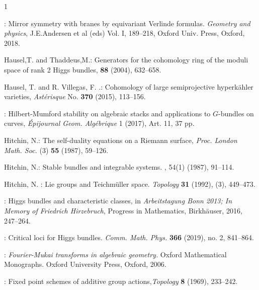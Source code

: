 \documentclass[12pt]{article}
\numberwithin{equation}{section}
\theoremstyle{remark}
\theoremstyle{definition}
\numberwithin{theorem}{section}
\renewcommand{\1}{\mathbbm{1}}
\begin{document}
\begin{thebibliography}{1}

:
Mirror symmetry with branes by equivariant Verlinde formulas. {\em Geometry and physics}, J.E.Andersen et al (eds) Vol. I, 189--218,  Oxford Univ. Press, Oxford, 2018.

 {\sc Hausel,T.  {\rm and} Thaddeus,M.}: \newblock  Generators for the cohomology ring of the moduli space of rank 2 Higgs bundles,  {\bf 88} (2004), 632--658.

 {\sc Hausel,  T. {\rm and}  R. Villegas, F. .}:
Cohomology of large semiprojective hyperk\"ahler varieties, 
{\em Ast\'erisque} No. {\bf 370} (2015), 113--156.%

:
Hilbert-Mumford stability on algebraic stacks and applications to $G$-bundles on curves,
{\em \'Epijournal Geom. Alg\'ebrique } 1 (2017), Art. 11, 37 pp.

 {\sc   Hitchin, N.}: { The self-duality equations on a Riemann 
	surface}, {\em Proc. London Math. Soc.} (3) {\bf 55} (1987), 59--126.

{\sc Hitchin, N.}:
\newblock Stable bundles and integrable systems.
, 54(1) (1987), 91--114.

 {\sc Hitchin, N. }:
Lie groups and Teichm\"uller space.
{\em Topology} {\bf  31} (1992), (3), 449--473.

: Higgs bundles and characteristic classes, in {
	\em Arbeitstagung Bonn 2013; In Memory of Friedrich Hirzebruch}, Progress in Mathematics, Birkh\"auser, 2016, 247--264. %

:
Critical loci for Higgs bundles. 
{\em Comm. Math. Phys.} {\bf 366} (2019), no. 2, 841--864. 

:
{ \em Fourier-Mukai transforms in algebraic geometry.}
Oxford Mathematical Monographs. Oxford University Press, Oxford, 2006.

: { Fixed point schemes of additive group actions},{\em Topology} {\bf 8} (1969),  233--242.


\end{thebibliography}
\end{document}
